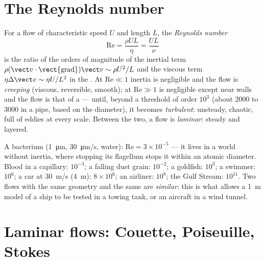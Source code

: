 \section{The Reynolds number}

\begin{definition}\label{def:b2:viscous-flows:reynolds}
For a flow of characteristic speed $U$ and length $L$, the \emph{Reynolds
number}
\[
\mathrm{Re} = \frac{\rho UL}{\eta} = \frac{UL}{\nu}
\]
is the ratio of the orders of magnitude of the inertial term
$\rho(\vect v\cdot\operatorname{\vect{grad}})\vect v \sim \rho U^2/L$ and the
viscous term $\eta\Delta\vect v \sim \eta U/L^2$ in the . At $\mathrm{Re} \ll 1$ inertia is negligible and the flow is
\emph{creeping} (viscous, reversible, smooth); at $\mathrm{Re} \gg 1$
 is negligible except near walls and the flow is that of a
 --- until, beyond a threshold of order $10^3$ (about $2000$
to $3000$ in a pipe, based on the diameter), it becomes \emph{turbulent}:
unsteady, chaotic, full of eddies at every scale. Between the two, a
flow is \emph{laminar}: steady and layered.
\end{definition}

\begin{example}\label{ex:b2:viscous-flows:revalues}
A bacterium (\qty{1}{\micro m}, \qty{30}{\micro m/s}, water): $\mathrm{Re} =
3 \times 10^{-5}$ --- it lives in a world without inertia, where stopping
its flagellum stops it within an atomic diameter. Blood in a capillary:
$10^{-3}$; a falling dust grain: $10^{-2}$; a goldfish: $10^3$; a swimmer:
$10^6$; a car at \qty{30}{m/s} (\qty{4}{m}): $8 \times 10^6$; an airliner: $10^8$;
the Gulf Stream: $10^{11}$. Two flows with the same geometry and the same
 are \emph{similar}: this is what allows a \qty{1}{m} model
of a ship to be tested in a towing tank, or an aircraft in a wind tunnel.
\end{example}

\section{Laminar flows: Couette, Poiseuille, Stokes}


